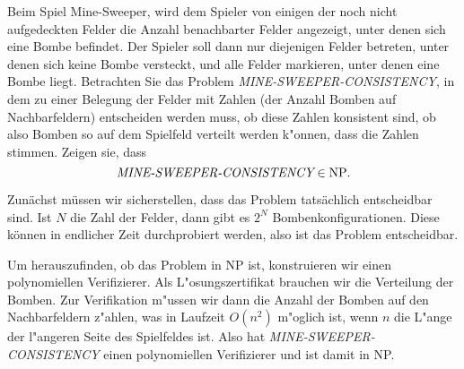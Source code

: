Beim Spiel Mine-Sweeper, wird dem Spieler von einigen der noch nicht
aufgedeckten Felder die Anzahl benachbarter Felder angezeigt, unter
denen sich eine Bombe befindet. Der Spieler soll dann nur diejenigen
Felder betreten, unter denen sich keine Bombe versteckt, und alle
Felder markieren, unter denen eine Bombe liegt. Betrachten Sie das
Problem {\it MINE-SWEEPER-CONSISTENCY}, in dem zu einer Belegung der
Felder mit Zahlen (der Anzahl Bomben auf Nachbarfeldern) entscheiden
werden muss, ob diese Zahlen konsistent sind, ob also Bomben so
auf dem Spielfeld verteilt werden k"onnen, dass die Zahlen stimmen.
Zeigen sie, dass
\[
\text{\it MINE-SWEEPER-CONSISTENCY}\in \text{NP}.
\]

\begin{loesung}
Zunächst müssen wir sicherstellen, dass das Problem tatsächlich
entscheidbar sind.
Ist $N$ die Zahl der Felder, dann gibt es $2^N$ Bombenkonfigurationen.
Diese können in endlicher Zeit durchprobiert werden, also ist das
Problem entscheidbar.

Um herauszufinden, ob das Problem in NP ist, konstruieren wir
einen polynomiellen Verifizierer.
Als L"osungszertifikat brauchen wir die Verteilung der Bomben.
Zur Verifikation m"ussen wir dann die Anzahl der Bomben auf den
Nachbarfeldern z"ahlen, was in Laufzeit $O(n^2)$ m"oglich ist,
wenn $n$ die L"ange der l"angeren Seite des Spielfeldes ist.
Also hat
{\it MINE-SWEEPER-CONSISTENCY} einen polynomiellen Verifizierer und
ist damit in NP.
\end{loesung}
